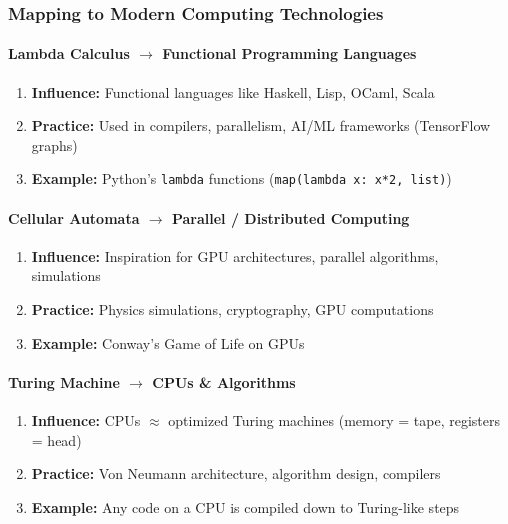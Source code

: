 \subsubsection{Mapping to Modern Computing Technologies}
\label{subsubsec:mapping-modern-tech}

\paragraph{Lambda Calculus $\rightarrow$ Functional Programming Languages}
\label{para:lambda-to-functional}

\begin{enumerate}
\item \textbf{Influence:} Functional languages like Haskell, Lisp, OCaml, Scala
\item \textbf{Practice:} Used in compilers, parallelism, AI/ML frameworks (TensorFlow graphs)
\item \textbf{Example:} Python's \texttt{lambda} functions (\texttt{map(lambda x: x*2, list)})
\end{enumerate}

\paragraph{Cellular Automata $\rightarrow$ Parallel / Distributed Computing}
\label{para:cellular-to-parallel}

\begin{enumerate}
\item \textbf{Influence:} Inspiration for GPU architectures, parallel algorithms, simulations
\item \textbf{Practice:} Physics simulations, cryptography, GPU computations
\item \textbf{Example:} Conway's Game of Life on GPUs
\end{enumerate}

\paragraph{Turing Machine $\rightarrow$ CPUs \& Algorithms}
\label{para:turing-to-cpu}

\begin{enumerate}
\item \textbf{Influence:} CPUs $\approx$ optimized Turing machines (memory = tape, registers = head)
\item \textbf{Practice:} Von Neumann architecture, algorithm design, compilers
\item \textbf{Example:} Any code on a CPU is compiled down to Turing-like steps
\end{enumerate}

